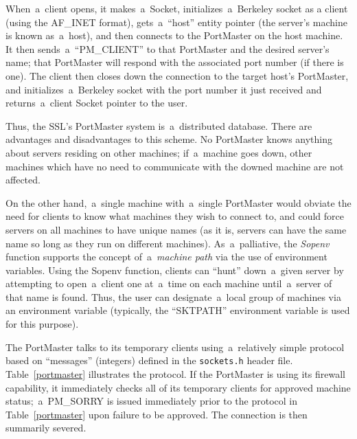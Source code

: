 \documentclass[12pt]{article}
\def\SSL{{\small SSL}}
\begin{document}
When~a~client opens, it makes~a~Socket, initializes~a~Berkeley socket as a
client (using the {\small AF\_INET} format), gets~a~``host'' entity pointer
(the server's machine is known as~a~host), and then connects to the PortMaster
on the host machine.  It then sends~a~``{\small PM\_CLIENT}'' to that
PortMaster and the desired server's name; that PortMaster will respond with the
associated port number (if there is one).  The client then closes down the
connection to the target host's PortMaster, and initializes~a~Berkeley socket
with the port number it just received and returns~a~client Socket pointer to
the user.

Thus, the \SSL's PortMaster system is~a~distributed database.  There are
advantages and disadvantages to this scheme. No PortMaster knows anything about
servers residing on other machines; if~a~machine goes down, other machines
which have no need to communicate with the downed machine are not affected.

On the other hand,~a~single machine with~a~single PortMaster would obviate the
need for clients to know what machines they wish to connect to, and could
force servers on all machines to have unique names (as it is, servers can have
the same name so long as they run on different machines).  As~a~palliative, the
{\em Sopenv} function supports the concept of~a~{\em machine path} via the
use of environment variables.  Using the Sopenv function, clients can ``hunt''
down~a~given server by attempting to open~a~client one at~a~time on each machine
until~a~server of that name is found.  Thus, the user can designate~a~local
group of machines via an environment variable (typically, the
``{\small SKTPATH}'' environment variable is used for this purpose).

The PortMaster talks to its temporary clients using~a~relatively simple
protocol based on ``messages'' (integers) defined in the \verb`sockets.h`
header file.  Table~\ref{portmaster} illustrates the protocol.  If the
PortMaster is using its firewall capability, it immediately checks all of
its temporary clients for approved machine status;~a~{\small PM\_SORRY} is
issued immediately prior to the protocol in Table~\ref{portmaster} upon
failure to be approved.  The connection is then summarily severed.
\end{document}
